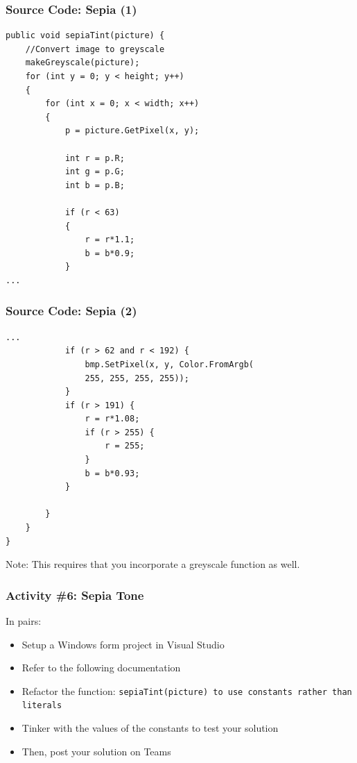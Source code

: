 \begin{frame}[fragile]
	\frametitle{Source Code: Sepia (1)}
	
\begin{lstlisting}
public void sepiaTint(picture) {
	//Convert image to greyscale
  	makeGreyscale(picture);  
	for (int y = 0; y < height; y++)
	{
		for (int x = 0; x < width; x++)
		{
			p = picture.GetPixel(x, y);
			
			int r = p.R;
			int g = p.G;
			int b = p.B;

			if (r < 63)
			{
				r = r*1.1;
				b = b*0.9;
			}			
...
\end{lstlisting}

\end{frame}

\begin{frame}[fragile]
	\frametitle{Source Code: Sepia (2)}
	
\begin{lstlisting}
...
			if (r > 62 and r < 192) {
				bmp.SetPixel(x, y, Color.FromArgb(
				255, 255, 255, 255));
			}
			if (r > 191) {
				r = r*1.08;
				if (r > 255) {
					r = 255; 	
				}
				b = b*0.93;
			}

		}
	}	
}

\end{lstlisting}
Note: This requires that you incorporate a greyscale function as well.

\end{frame}

\begin{frame}
	\frametitle{Activity \#6: Sepia Tone}
	
	In pairs:
	
	\vspace{2em}
	
	\begin{itemize}		
		\item Setup a Windows form project in Visual Studio
		\item Refer to the following documentation
		\item Refactor the function: \texttt{sepiaTint(picture) to use constants rather than literals}
		\item Tinker with the values of the constants to test your solution
		\item Then, post your solution on Teams
	\end{itemize}
\end{frame}


